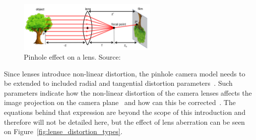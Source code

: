 
\begin{figure}[!ht]
	\centering
	\includegraphics[width=0.6\textwidth]{img/camera/pinhole_with_lense.png}
	\caption[Pinhole effect on a lens]{Pinhole effect on a lens. Source:~\cite{camera_models}}
	\label{fig:pinhole_with_lense}
\end{figure}

Since lenses introduce non-linear distortion, the pinhole camera model needs to be extended to included radial and tangential distortion parameters~\cite{Bouguet2010, manuapphotogrammetry, Heikkila1997}. Such parameters indicate how the non-linear distortion of the camera lenses affects the image projection on the camera plane~\cite{camera_models, Sturm2010} and how can this be corrected~\cite{Heikkila1997, Bouguet2010, opencv_doc}. The equations behind that expression are beyond the scope of this introduction and therefore will not be detailed here, but the effect of lens aberration can be seen on Figure~\ref{fig:lense_distortion_types}.

